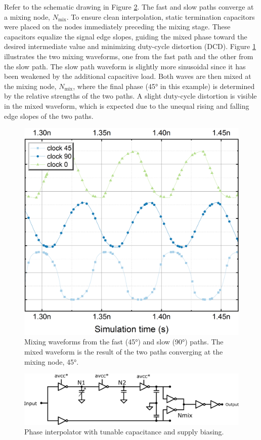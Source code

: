 Refer to the schematic drawing in Figure \ref{fig:PI_1_schematic}. The fast and slow paths converge at a mixing node, $N_\text{mix}$. To ensure clean interpolation, static termination capacitors were placed on the nodes immediately preceding the mixing stage. These capacitors equalize the signal edge slopes, guiding the mixed phase toward the desired intermediate value and minimizing duty-cycle distortion (DCD).
Figure \ref{fig:PI_1_mixing_waveforms} illustrates the two mixing waveforms, one from the fast path and the other from the slow path. The slow path waveform is slightly more sinusoidal since it has been weakened by the additional capacitive load. Both waves are then mixed at the mixing node, $N_\text{mix}$, where the final phase (\ang{45} in this example) is determined by the relative strengths of the two paths. A slight duty-cycle distortion is visible in the mixed waveform, which is expected due to the unequal rising and falling edge slopes of the two paths. 
\begin{figure}
  \centering
  \includegraphics[width=0.5\linewidth]{figures/Results/PI_8out_CSI-clock0Clock90MixingBuildingClock45.png}
  \caption{Mixing waveforms from the fast (\ang{45}) and slow (\ang{90}) paths. The mixed waveform is the result of the two paths converging at the mixing node, \ang{45}.}
  \label{fig:PI_1_mixing_waveforms}
\end{figure}
\begin{figure}[H]
  \centering
  \includegraphics[width=0.8\linewidth]{figures/Schematics/clock_generation_half_V0.png}
  \caption{Phase interpolator with tunable capacitance and supply biasing.}
  \label{fig:PI_1_schematic}
\end{figure}

